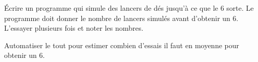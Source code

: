 
\begin{exercice}\label{exosmath-0583}

    Écrire un programme qui simule des lancers de dés jusqu'à ce que le \( 6 \) sorte. Le programme doit donner le nombre de lancers simulés avant d'obtenir un \( 6\). L'essayer plusieurs fois et noter les nombres.

    Automatiser le tout pour estimer combien d'essais il faut en moyenne pour obtenir un \( 6\).

\end{exercice}
